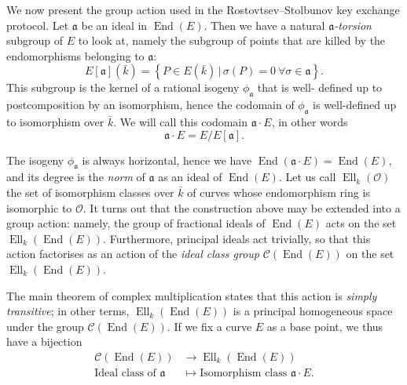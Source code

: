 \documentclass{article}
\newcommand{\Cl}{\mathcal{C}}
\renewcommand{\O}{\mathcal{O}}
\newcommand{\set}[1]{\left\{#1\right\}}
\newcommand{\suchthat}{\,|\,}
\renewcommand{\frak}{\mathfrak}
\theoremstyle{definition}
\DeclareMathOperator{\End}{End}
\DeclareMathOperator{\Ell}{Ell}
\begin{document}
We now present the group action used in the Rostovtsev--Stolbunov key exchange 
protocol. Let $\frak a$ be an ideal in $\End(E)$. Then we have a natural \emph
{${\frak a}$-torsion} subgroup of $E$ to look at, namely the subgroup of points
that are killed by the endomorphisms belonging to $\frak a$:
\[
E[\frak a](\bar{k}) = \set{P\in E(\bar{k}) \suchthat \sigma(P) = 0\ 
\forall\sigma\in\frak a}.
\]
This subgroup is the kernel of a rational isogeny $\phi_{\frak a}$ that is well-
defined up to postcomposition by an isomorphism, hence the codomain of $\phi_{
\frak a}$ is well-defined up to isomorphism over $\bar{k}$. We will call this 
codomain $\frak a\cdot E$, in other words
\[
\frak a\cdot E = E/E[\frak a].
\]

The isogeny $\phi_{\frak a}$ is always horizontal, hence we have $\End(\frak a
\cdot E) = \End(E)$, and its degree is the \emph{norm} of $\frak a$ as an ideal 
of $\End(E)$.
Let us call $\Ell_k(\O)$ the set of isomorphism classes over $\bar{k}$ of 
curves whose endomorphism ring is isomorphic to $\O$. It turns out that the 
construction above may be extended into a group action: namely, the group of 
fractional ideals of $\End(E)$ acts on the set $\Ell_k(\End(E))$. Furthermore, 
principal ideals act trivially, so that this action factorises as an action of 
the \emph{ideal class group} $\Cl(\End(E))$ on the set $\Ell_k(\End(E))$.

The main theorem of complex multiplication states that this action is \emph{
simply transitive}; in other terms, $\Ell_k(\End(E))$ is a principal 
homogeneous space under the group $\Cl(\End(E))$. If we fix a curve $E$ as a 
base point, we thus have a bijection
\[
\begin{aligned}
\Cl(\End(E)) &\to \Ell_k(\End(E)) \\
\text{Ideal class of }\frak a &\mapsto \text{Isomorphism class }\frak a\cdot E.
\end{aligned}
\]
\end{document}
